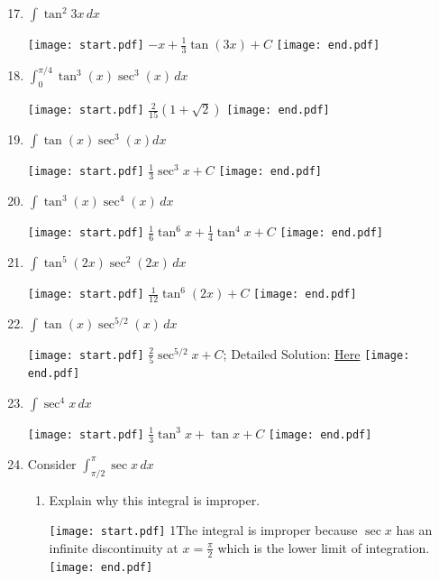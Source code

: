 \documentclass[12pt]{article}
\begin{document}

\begin{enumerate}
\setcounter{enumi}{16}

\item $\int \tan^2{3x}\,dx$ 

\texttt{[image: start.pdf]}
{{$-x+\frac{1}{3}\tan{(3x)}+C$}}
\texttt{[image: end.pdf]}


\item $\int_0^{\pi/4} \tan^{3}{(x)}\sec^3{(x)}\,dx$  

\texttt{[image: start.pdf]}
{{$\frac{2}{15}\left(1+\sqrt{2}\right)$}}
\texttt{[image: end.pdf]}


\item $\int \tan{(x)}\sec^3{(x)}dx$ 

\texttt{[image: start.pdf]}
{{$\frac{1}{3}\sec^3{x}+C$}}
\texttt{[image: end.pdf]}


\item $\int \tan^3{(x)}\sec^4{(x)\,}dx$ 

\texttt{[image: start.pdf]}
{{$\frac{1}{6}\tan^6{x}+\frac{1}{4}\tan^{4}{x}+C$}}
\texttt{[image: end.pdf]}


\item $\int \tan^5{(2x)}\sec^2{(2x)}\,dx$ 

\texttt{[image: start.pdf]}
{{$\frac{1}{12}\tan^6{(2x)}+C$}}
\texttt{[image: end.pdf]}


\item $\int \tan{(x)}\sec^{5/2}{(x)}\,dx$ 

\texttt{[image: start.pdf]}
{{$\frac{2}{5}\sec^{5/2}{x}+C$; Detailed Solution: \textcolor{blue}{\href{http://www.math.drexel.edu/classes/Calculus/resources/Math122HW/Solutions/122_15_Trig_Int_22.pdf}{Here}}}}
\texttt{[image: end.pdf]}


\item $\int \sec^{4}{x}\,dx$ 

\texttt{[image: start.pdf]}
{{$\frac{1}{3}\tan^3{x}+\tan{x}+C$}}
\texttt{[image: end.pdf]}


\item Consider $\int_{\pi/2}^\pi \sec{x} \,dx$

\begin{enumerate}

\item Explain why this integral is improper.

\texttt{[image: start.pdf]}
{{{1\linewidth}{The integral is improper because $\sec{x}$ has an infinite discontinuity at $x=\frac{\pi}{2}$ which is the lower limit of integration.}}}
\texttt{[image: end.pdf]}



\end{enumerate}
\end{enumerate}
\end{document}
